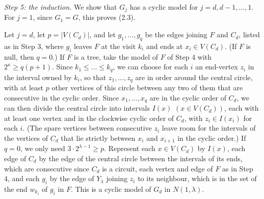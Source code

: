 {\textit{Step 5: the induction.} We show that $G_j$ has a cyclic model for $j = d, d - 1, \dots, 1$. For $j = 1$, since $G_1 = G$, this proves (2.3).

Let $j = d$, let $p = |V(C_d)|$, and let $g_1, \dots, g_q$ be the edges joining $F$ and $C_d$, listed as in Step 3, where $g_i$ leaves $F$ at the visit $k_i$ and ends at $x_i \in V(C_d)$. (If $F$ is null, then $q = 0$.) If $F$ is a tree, take the model of $F$ of Step 4 with $2^\kappa \ge q(p + 1)$. Since $k_1 \le \dots \le k_q$, we can choose for each $i$ an end-vertex $z_i$ in the interval owned by $k_i$, so that $z_1, \dots, z_q$ are in order around the central circle, with at least $p$ other vertices of this circle between any two of them that are consecutive in the cyclic order. Since $x_1, \dots, x_q$ are in the cyclic order of $C_d$, we can then divide the central circle into intervals $I(x)$ $(x \in V(C_d))$, each with at least one vertex and in the clockwise cyclic order of $C_d$, with $z_i \in I(x_i)$ for each $i$. (The spare vertices between consecutive $z_i$ leave room for the intervals of the vertices of $C_d$ that lie strictly between $x_i$ and $x_{i+1}$ in the cyclic order.) If $q = 0$, we only need $3 \cdot 2^{\lambda - 1} \ge p$. Represent each $x \in V(C_d)$ by $I(x)$, each edge of $C_d$ by the edge of the central circle between the intervals of its ends, which are consecutive since $C_d$ is a circuit, each vertex and edge of $F$ as in Step 4, and each $g_i$ by the edge of $Y_\lambda$ joining $z_i$ to its neighbour, which is in the set of the end $w_{k_i}$ of $g_i$ in $F$. This is a cyclic model of $G_d$ in $N(1, \lambda)$.

}
